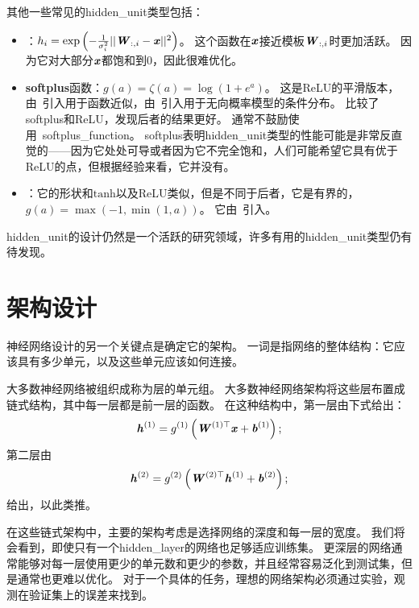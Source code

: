 其他一些常见的\gls{hidden_unit}类型包括：
\begin{itemize}
\item {}：$h_i = \exp \left (-\frac{1}{\sigma_i^2}|| \boldsymbol{\mathit{W}}_{:,i}-\boldsymbol{\mathit{x}}||^2 \right )$。
这个函数在$\boldsymbol{\mathit{x}}$接近模板$\boldsymbol{\mathit{W}}_{:,i}$时更加活跃。
因为它对大部分$\boldsymbol{\mathit{x}}$都饱和到0，因此很难优化。

\item \textbf{\gls{softplus}}函数：$g(a)=\zeta(a)=\log(1+e^a)$。
这是\gls{ReLU}的平滑版本，由~\cite{Dugas01}引入用于函数近似，由~\cite{Nair-2010-small}引入用于无向概率模型的条件分布。
\cite{Glorot+al-AI-2011-small}比较了softplus和\gls{ReLU}，发现后者的结果更好。
通常不鼓励使用~\gls{softplus_function}。
softplus表明\gls{hidden_unit}类型的性能可能是非常反直觉的——因为它处处可导或者因为它不完全饱和，人们可能希望它具有优于\gls{ReLU}的点，但根据经验来看，它并没有。

\item {}：它的形状和$\text{tanh}$以及\gls{ReLU}类似，但是不同于后者，它是有界的，$g(a)=\max(-1, \min(1,a))$。
它由~\cite{Collobert04}引入。
\end{itemize}

\gls{hidden_unit}的设计仍然是一个活跃的研究领域，许多有用的\gls{hidden_unit}类型仍有待发现。

\section{架构设计}
\label{sec:architecture_design}

神经网络设计的另一个关键点是确定它的架构。
一词是指网络的整体结构：它应该具有多少单元，以及这些单元应该如何连接。


大多数神经网络被组织成称为层的单元组。
大多数神经网络架构将这些层布置成链式结构，其中每一层都是前一层的函数。
在这种结构中，第一层由下式给出：
\begin{equation}
\boldsymbol{\mathit{h}}^{(1)}= g^{(1)}\left ( \boldsymbol{\mathit{W}}^{(1)\top} \boldsymbol{\mathit{x}} + \boldsymbol{\mathit{b}}^{(1)}\right );
\end{equation}
第二层由
\begin{equation}
\boldsymbol{\mathit{h}}^{(2)} = g^{(2)}\left ( \boldsymbol{\mathit{W}}^{(2)\top}\boldsymbol{\mathit{h}}^{(1)}+\boldsymbol{\mathit{b}}^{(2)} \right );
\end{equation}
给出，以此类推。

在这些链式架构中，主要的架构考虑是选择网络的深度和每一层的宽度。
我们将会看到，即使只有一个\gls{hidden_layer}的网络也足够适应训练集。
更深层的网络通常能够对每一层使用更少的单元数和更少的参数，并且经常容易泛化到测试集，但是通常也更难以优化。
对于一个具体的任务，理想的网络架构必须通过实验，观测在验证集上的误差来找到。

